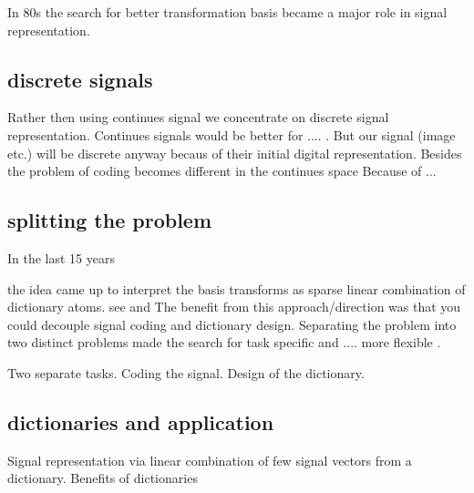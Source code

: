 In 80s the search for better transformation basis became a major role in signal representation. \cite{}

\subsection{discrete signals}
Rather then using continues signal we concentrate on discrete signal representation.
Continues signals would be better for .... . But our signal (image etc.) will be discrete anyway becaus of their initial digital representation. 
Besides the problem of coding becomes different in the continues space \cite{} Because of ...

\subsection{splitting the problem}
\cite{Rubinstein2010}
In the last 15 years 

the idea came up to interpret the basis transforms as sparse linear combination of dictionary atoms.
see \cite{Olshausen1997} and \cite{}
The benefit from this approach/direction was that you could decouple signal coding and dictionary design.
Separating the problem into two distinct problems made the search for task specific and .... more flexible \cite{?}.

Two separate tasks.
Coding the signal. Design of the dictionary.

\subsection{dictionaries and application}
Signal representation via linear combination of few signal vectors from a dictionary.
Benefits of dictionaries


